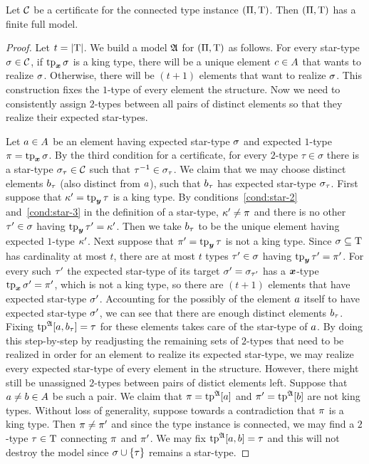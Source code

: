 \begin{theorem}
Let $\mathcal{C}$ be a certificate for the connected type instance $(\Pi,\mathrm{T})$.
Then $(\Pi,\mathrm{T})$ has a finite full model.
\end{theorem}
\begin{proof}
Let $t = \left|\mathrm{T}\right|$.
We build a model $\mathfrak{A}$ for $(\Pi,\mathrm{T})$ as follows. For every star-type
$\sigma \in \mathcal{C}$, if $\operatorname{tp}_{\bm{x}}\sigma$ is a king type, there will be a unique element
$c \in A$ that wants to realize $\sigma$. Otherwise, there will be
$(t+1)$ elements that want to realize $\sigma$.
This construction fixes the $1$-type of every element the structure. 
Now we need to consistently assign $2$-types between all pairs of distinct
elements so that they realize their expected star-types.

Let $a \in A$ be an element having expected star-type $\sigma$ and
expected $1$-type $\pi = \operatorname{tp}_{\bm{x}}\sigma$.
By the third condition for a certificate, for every $2$-type $\tau \in \sigma$
there is a star-type $\sigma_\tau \in \mathcal{C}$ such that $\tau^{-1} \in \sigma_\tau$.
We claim that we may choose distinct elements $b_\tau$ (also distinct from
$a$), such that $b_\tau$ has expected star-type $\sigma_\tau$.
First suppose that ${\kappa'} = \operatorname{tp}_{\bm{y}}\tau$ is a king type.
By conditions~\ref{cond:star-2} and~\ref{cond:star-3} in the definition of a
star-type, ${\kappa'} \neq \pi$ and there is no other ${\tau'} \in \sigma$ having
$\operatorname{tp}_{\bm{y}}{\tau'} = {\kappa'}$. Then we take $b_\tau$ to be the unique element having
expected $1$-type ${\kappa'}$.
Next suppose that ${\pi'} = \operatorname{tp}_{\bm{y}}\tau$ is not a king type.
Since $\sigma \subseteq \mathrm{T}$ has cardinality at most $t$, there are at most $t$
types ${\tau'} \in \sigma$ having $\operatorname{tp}_{\bm{y}}{\tau'} = {\pi'}$.
For every such ${\tau'}$ the expected star-type of its target $\sigma' =
\sigma_{{\tau'}}$ has a $\bm{x}$-type $\operatorname{tp}_{\bm{x}}\sigma' = {\pi'}$, which is not a king
type, so there are $(t+1)$ elements that have expected star-type $\sigma'$.
Accounting for the possibly of the element $a$ itself to have expected
star-type $\sigma'$, we can see that there are enough distinct elements
$b_\tau$. Fixing $\operatorname{tp}^{\mathfrak{A}}[a,b_\tau] = \tau$ for these elements takes
care of the star-type of $a$. By doing this step-by-step by readjusting the
remaining sets of $2$-types that need to be realized in order for an element
to realize its expected star-type, we may realize every expected star-type of
every element in the structure. However, there might still be unassigned
$2$-types between pairs of distict elements left.
Suppose that $a \neq b \in A$ be such a pair. We claim that
$\pi = \operatorname{tp}^{\mathfrak{A}}[a]$ and ${\pi'} = \operatorname{tp}^{\mathfrak{A}}[b]$ are not king types. Without
loss of generality, suppose towards a contradiction that $\pi$ is a king type.
Then $\pi \neq {\pi'}$ and since the type instance is connected, we may find a
$2$-type $\tau \in \mathrm{T}$ connecting $\pi$ and ${\pi'}$.
We may fix $\operatorname{tp}^{\mathfrak{A}}[a,b] = \tau$ and this will not destroy the model since
$\sigma \cup \left\{\tau\right\}$ remains a star-type.
\end{proof}